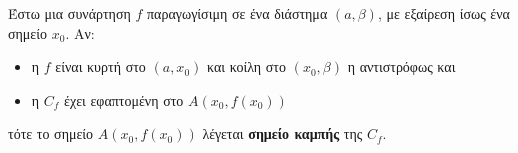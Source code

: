 Έστω μια συνάρτηση $ f $ παραγωγίσιμη σε ένα διάστημα $ (a,\beta) $, με εξαίρεση ίσως ένα σημείο $ x_0 $. Αν:
\begin{itemize}[itemsep=0mm]
\item η $ f $ είναι κυρτή στο $ (a,x_0) $ και κοίλη στο $ (x_0,\beta) $ η αντιστρόφως και
\item η $ C_f $ έχει εφαπτομένη στο $ A(x_0,f(x_0)) $
\end{itemize}
τότε το σημείο $ A(x_0,f(x_0)) $ λέγεται \textbf{σημείο καμπής} της $ C_f $.
